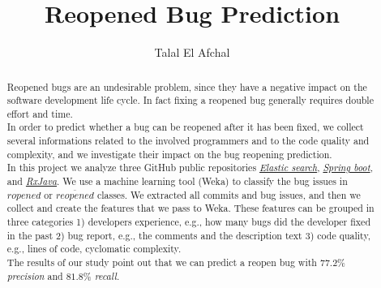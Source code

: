 \documentclass[sigconf,review]{acmart}
\begin{document}
\title{Reopened Bug Prediction }
\author{Talal El Afchal}

\begin{abstract}
Reopened bugs are an undesirable problem, since they have a negative impact on the software development life cycle. In fact fixing a reopened bug generally requires double effort and time.\\
In order to predict whether a bug can be reopened after it has been fixed, we collect several informations related to the involved programmers and to the code quality and complexity, and we investigate their impact on the bug reopening prediction. \\
In this project we analyze three GitHub public repositories  \href{https://github.com/elastic/elasticsearch}{\emph{Elastic search}}, \href{https://github.com/spring-projects/spring-boot}{\emph{Spring boot}}, and \href{https://github.com/ReactiveX/RxJava}{\emph{RxJava}}. We use a machine learning tool (Weka) to classify the bug issues in $ropened$ or $\overline{reopened}$ classes. We extracted all commits and bug issues, and then we collect and create the features that we pass to Weka. These features can be grouped in three categories 1) developers experience, e.g., how many bugs did the developer fixed in the past 2) bug report, e.g., the comments and the description text  3) code quality, e.g., lines of code, cyclomatic complexity.\\
The results of our study point out that we can predict a reopen bug with $77.2\%$ \emph{precision} and $81.8\%$ \emph{recall}.
\end{abstract}

\maketitle
\end{document}
